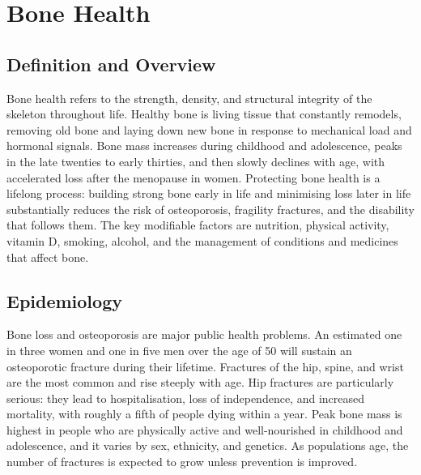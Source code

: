 \chapter{Bone Health}

\section*{Definition and Overview}
Bone health refers to the strength, density, and structural integrity of the skeleton throughout life. Healthy bone is living tissue that constantly remodels, removing old bone and laying down new bone in response to mechanical load and hormonal signals. Bone mass increases during childhood and adolescence, peaks in the late twenties to early thirties, and then slowly declines with age, with accelerated loss after the menopause in women. Protecting bone health is a lifelong process: building strong bone early in life and minimising loss later in life substantially reduces the risk of osteoporosis, fragility fractures, and the disability that follows them. The key modifiable factors are nutrition, physical activity, vitamin D, smoking, alcohol, and the management of conditions and medicines that affect bone.

\section*{Epidemiology}
Bone loss and osteoporosis are major public health problems. An estimated one in three women and one in five men over the age of 50 will sustain an osteoporotic fracture during their lifetime. Fractures of the hip, spine, and wrist are the most common and rise steeply with age. Hip fractures are particularly serious: they lead to hospitalisation, loss of independence, and increased mortality, with roughly a fifth of people dying within a year. Peak bone mass is highest in people who are physically active and well-nourished in childhood and adolescence, and it varies by sex, ethnicity, and genetics. As populations age, the number of fractures is expected to grow unless prevention is improved.


